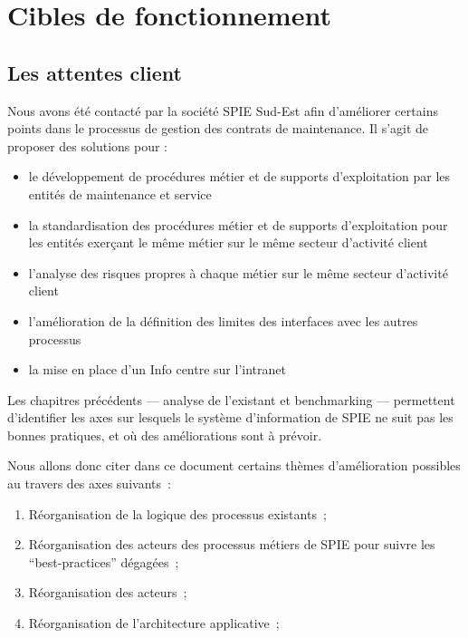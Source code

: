\chapter{Cibles de fonctionnement}

\section{Les attentes client}

Nous avons été contacté par la société SPIE Sud-Est afin d'améliorer certains points dans le processus de gestion des contrats de maintenance. Il s'agit de proposer des solutions pour :

\begin{itemize}
    \item le développement de procédures métier et de supports d'exploitation par les entités de maintenance et service
    \item la standardisation des procédures métier et de supports d'exploitation pour les entités exerçant le même métier sur le même secteur d'activité client
    \item l'analyse des risques propres à chaque métier sur le même secteur d'activité client
    \item l'amélioration de la définition des limites des interfaces avec les autres processus
    \item la mise en place d'un Info centre sur l'intranet
\end{itemize}

Les chapitres précédents --- analyse de l'existant et benchmarking --- permettent d'identifier les axes sur lesquels le système d'information de SPIE ne suit pas les bonnes pratiques, et où des améliorations sont à prévoir.

    Nous allons donc citer dans ce document certains thèmes d'amélioration possibles au travers des axes suivants~:

    \begin{enumerate}
        \item Réorganisation de la logique des processus existants~;
        \item Réorganisation des acteurs des processus métiers de SPIE pour suivre les ``best-practices'' dégagées~;
        \item Réorganisation des acteurs~;
        \item Réorganisation de l'architecture applicative~;
    \end{enumerate}

